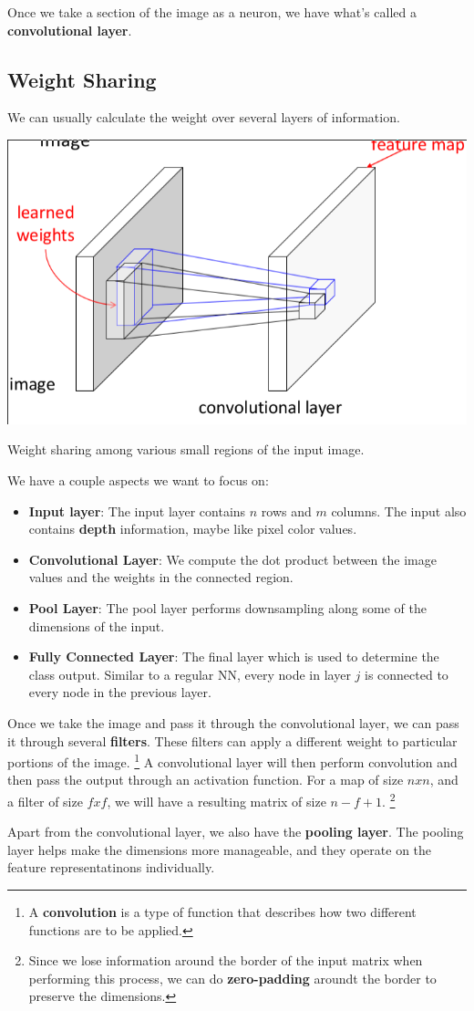 \documentclass{tufte-handout}
\begin{document}
Once we take a section of the image as a neuron, we have what's called a \textbf{convolutional layer}.
\subsection{Weight Sharing}
We can usually calculate the weight over several layers of information. 

\begin{marginfigure}
		\includegraphics[scale=0.2]{weight_sharing}
	\caption{Weight sharing among various small regions of the input image.}
\end{marginfigure}

We have a couple aspects we want to focus on:
\begin{itemize}
	\item \textbf{Input layer}: The input layer contains $n$ rows and $m$ columns. The input also contains 
			\textbf{depth} information, maybe like pixel color values.
	\item \textbf{Convolutional Layer}: We compute the dot product between the image values and the weights 
			in the connected region. 
	\item \textbf{Pool Layer}: The pool layer performs downsampling along some of the dimensions of the 
			input.
	\item \textbf{Fully Connected Layer}: The final layer which is used to determine the class output. 
			Similar to a regular NN, every node in layer $j$ is connected to every node in the previous
					layer.
\end{itemize}
Once we take the image and pass it through the convolutional layer, we can pass it through several 
	\textbf{filters}. 
These filters can apply a different weight to particular portions of the image. 
\footnote{A \textbf{convolution} is a type of function that describes how two different functions are to 
be applied.}
A convolutional layer will then perform convolution and then pass the output through an activation function.
For a map of size $nxn$, and a filter of size $fxf$, we will have a resulting matrix of size $n-f+1$.
\footnote{Since we lose information around the border of the input matrix when performing this process,
	we can do \textbf{zero-padding} aroundt the border to preserve the dimensions.}

Apart from the convolutional layer, we also have the \textbf{pooling layer}.
The pooling layer helps make the dimensions more manageable, and they operate on the feature representatinons
	individually.
\end{document}
